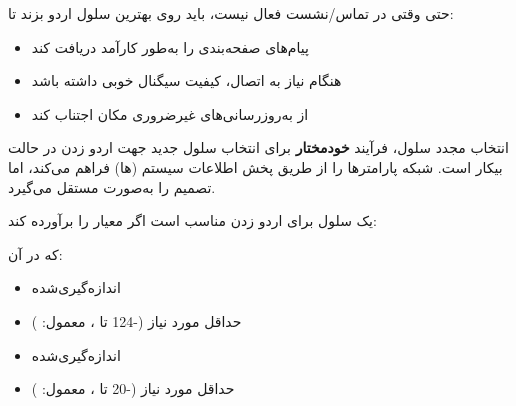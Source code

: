 

\CNchained{}

حتی وقتی در تماس/\allowbreak{}نشست فعال نیست،  باید روی بهترین سلول اردو بزند تا:

\begin{itemize}
\tightlist
\item
  پیام‌های صفحه‌بندی را به‌طور کارآمد دریافت کند
\item
  هنگام نیاز به اتصال، کیفیت سیگنال خوبی داشته باشد
\item
  از به‌روزرسانی‌های غیرضروری مکان اجتناب کند
\end{itemize}


انتخاب مجدد سلول، فرآیند \textbf{خودمختار } برای انتخاب سلول جدید جهت اردو زدن در حالت بیکار است. شبکه پارامترها را از طریق پخش اطلاعات سیستم (ها) فراهم می‌کند، اما  تصمیم را به‌صورت مستقل می‌گیرد.



\CNchained{}

یک سلول برای اردو زدن مناسب است اگر معیار  را برآورده کند:


که در آن:

\begin{itemize}
\tightlist
\item
   اندازه‌گیری‌شده 
\item
   حداقل مورد نیاز (-124 تا ، معمول: )
\item
   اندازه‌گیری‌شده 
\item
   حداقل مورد نیاز (-20 تا ، معمول: )
\end{itemize}

